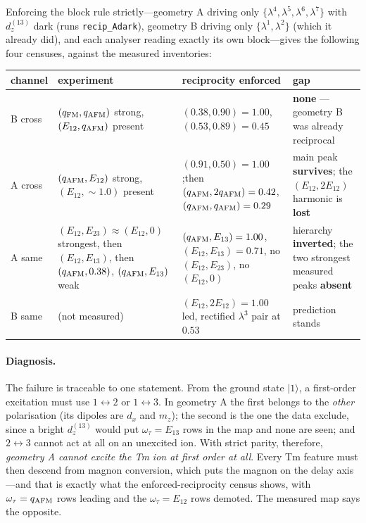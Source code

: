 \documentclass[11pt]{article}
\newcommand{\ket}[1]{|#1\rangle}
\newcommand{\qafm}{q_{\rm AFM}}
\newcommand{\qfm}{q_{\rm FM}}
\begin{document}
Enforcing the block rule strictly---geometry A driving only
$\{\lambda^4,\lambda^5,\lambda^6,\lambda^7\}$ with $d_z^{(13)}$ dark
(runs \texttt{recip\_Adark}), geometry B driving only
$\{\lambda^1,\lambda^2\}$ (which it already did), and each analyser
reading exactly its own block---gives the following four censuses,
against the measured inventories:

\begin{center}\small
\renewcommand{\arraystretch}{1.3}
\begin{tabular}{p{1.7cm}p{4.4cm}p{4.4cm}p{4.2cm}}
\toprule
channel & experiment & reciprocity enforced & gap\\
\midrule
B cross & $(\qfm,\qafm)$ strong,
  $(E_{12},\qafm)$ present
& $(0.38,0.90)=1.00$,\newline $(0.53,0.89)=0.45$
& \textbf{none} --- geometry B was already reciprocal\\
A cross & $(\qafm,E_{12})$ strong,\newline $(E_{12},\sim\!1.0)$ present
& $(0.91,0.50)=1.00$;\newline then $(\qafm,2\qafm)=0.42$,
  $(\qafm,\qafm)=0.29$
& main peak \textbf{survives}; the $(E_{12},2E_{12})$
  harmonic is \textbf{lost}\\
A same & $(E_{12},E_{23})\!\approx\!(E_{12},0)$ strongest,
  then $(E_{12},E_{13})$, then $(\qafm,0.38)$, $(\qafm,E_{13})$ weak
& $(\qafm,E_{13})=1.00$,\newline $(E_{12},E_{13})=0.71$,
  no $(E_{12},E_{23})$, no $(E_{12},0)$
& hierarchy \textbf{inverted}; the two strongest measured peaks
  \textbf{absent}\\
B same & (not measured) & $(E_{12},2E_{12})=1.00$ led, rectified
  $\lambda^3$ pair at $0.53$
& prediction stands\\
\bottomrule
\end{tabular}
\end{center}

\paragraph{Diagnosis.}
The failure is traceable to one statement.  From the ground state
$\ket1$, a first-order excitation must use $1\!\leftrightarrow\!2$ or
$1\!\leftrightarrow\!3$.  In geometry A the first belongs to the
\emph{other} polarisation (its dipoles are $d_{x}$ and $m_z$); the
second is the one the data exclude, since a bright $d_z^{(13)}$ would
put $\omega_\tau=E_{13}$ rows in the map and none are seen; and
$2\!\leftrightarrow\!3$ cannot act at all on an unexcited ion.  With
strict parity, therefore, \emph{geometry A cannot excite the Tm ion at
first order at all}.  Every Tm feature must then descend from magnon
conversion, which puts the magnon on the delay axis---and that is
exactly what the enforced-reciprocity census shows, with
$\omega_\tau=\qafm$ rows leading and the $\omega_\tau=E_{12}$ rows
demoted.  The measured map says the opposite.
\end{document}
